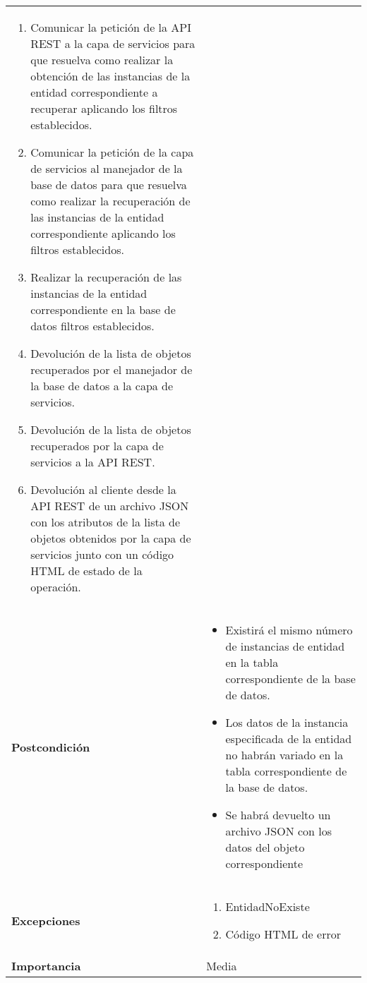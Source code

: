 \begin{longtable}{ p{} p{} }
\begin{enumerate}
        \item Comunicar la petición de la API REST a la capa de servicios para que resuelva como realizar la obtención de las instancias de la entidad correspondiente a recuperar aplicando los filtros establecidos.
        \item Comunicar la petición de la capa de servicios al manejador de la base de datos para que resuelva como realizar la recuperación de las instancias de la entidad correspondiente aplicando los filtros establecidos.
        \item Realizar la recuperación de las instancias de la entidad correspondiente en la base de datos filtros establecidos.
        \item Devolución de la lista de objetos recuperados por el manejador de la base de datos a la capa de servicios.
        \item Devolución de la lista de objetos recuperados por la capa de servicios a la API REST.
        \item Devolución  al cliente  desde la API REST de un archivo JSON con los atributos de la lista de objetos obtenidos por la capa de servicios junto con un código HTML de estado de la operación. 
    \end{enumerate}\\
    \textbf{Postcondición}        &
    \begin{itemize}
            \item Existirá el mismo número de instancias de entidad en la tabla correspondiente de la base de datos. 
            \item Los datos de la instancia especificada de la entidad no habrán variado en la tabla correspondiente de la base de datos.
            \item Se habrá devuelto un archivo JSON con los datos del objeto correspondiente
    \end{itemize}\\
    \textbf{Excepciones}          & 
        \begin{enumerate}
        \item EntidadNoExiste
            \item Código HTML de error
        \end{enumerate} \\
    \textbf{Importancia}          & Media \\
    \hline
\end{longtable}


